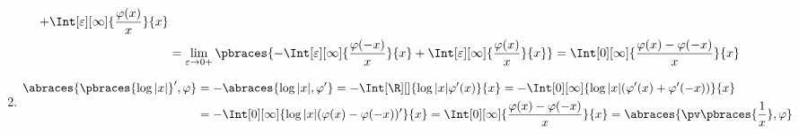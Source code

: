 \begin{solution}
\begin{enumerate}[label = (\roman*)]
\begin{align*}
{		+
		\Int[\varepsilon][\infty]
		{
			\frac{\varphi(x)}{x}
		}{x}
	} \\
	&= \lim_{\varepsilon \to 0+}
	\pbraces
	{
	-\Int[\varepsilon][\infty]
	{
		\frac{\varphi(-x)}{x}
	}{x}
	+
	\Int[\varepsilon][\infty]
	{
		\frac{\varphi(x)}{x}
	}{x}
	} = \Int[0][\infty]{\frac{\varphi(x) - \varphi(-x)}{x}}{x}
	\end{align*}
	\item 
	\begin{align*}
	\abraces{\pbraces{\log|x|}^\prime, \varphi} &= -\abraces{\log|x|, \varphi^\prime} = -\Int[\R][]{\log|x| \varphi^\prime(x)}{x} = -\Int[0][\infty]{\log|x| (\varphi^\prime(x) + \varphi^\prime(-x))}{x} \\
	&= -\Int[0][\infty]{\log|x| (\varphi(x) - \varphi(-x))^\prime}{x} = \Int[0][\infty]{\frac{\varphi(x) - \varphi(-x)}{x}}{x} = \abraces{\pv\pbraces{\frac{1}{x}}, \varphi}
	\end{align*}
\end{enumerate}

\end{solution}

